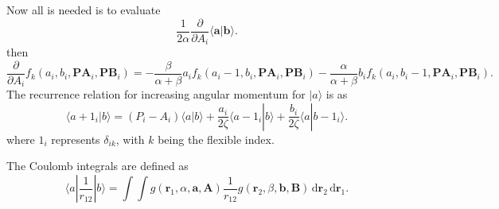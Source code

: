 Now all  is needed is to evaluate
\[
\frac{1}{2\alpha} \frac{\partial }{\partial A_i}  \langle \boldsymbol{a} | \boldsymbol{b} \rangle 
.\] 
then
\[
	\frac{\partial }{\partial A_i} f_k (a_i,b_i,\boldsymbol{PA}_i, \boldsymbol{PB}_i) = - \frac{\beta}{\alpha+\beta} a_i f_k (a_i-1,b_i,\boldsymbol{PA}_i,\boldsymbol{PB}_i) - \frac{\alpha}{\alpha + \beta} b_i f_k (a_i, b_i -1 , \boldsymbol{PA}_i,\boldsymbol{PB}_i)
.\] 
The recurrence relation for increasing angular momentum for $| a \rangle $ is as
\[
	\langle a+1_i | b \rangle = (P_i - A_i) \langle a | b \rangle + \frac{a_i}{2 \zeta} \langle a- 1_i | b \rangle + \frac{b_i}{2\zeta} \langle a | b-1_i \rangle 
.\] 
where $1_i$ represents  $\delta_{ik}$, with $k$ being the flexible index.

The Coulomb integrals are defined as
\[
	\langle a | \frac{1}{r_{12}} | b \rangle = \int \int g(\boldsymbol{r}_1,\alpha,\boldsymbol{a},\boldsymbol{A}) \frac{1}{r_{12}} g(\boldsymbol{r}_2,\beta, \boldsymbol{b},\boldsymbol{B}) \, \mathrm{d}\boldsymbol{r}_2  \, \mathrm{d} \boldsymbol{r}_1 
.\] 

